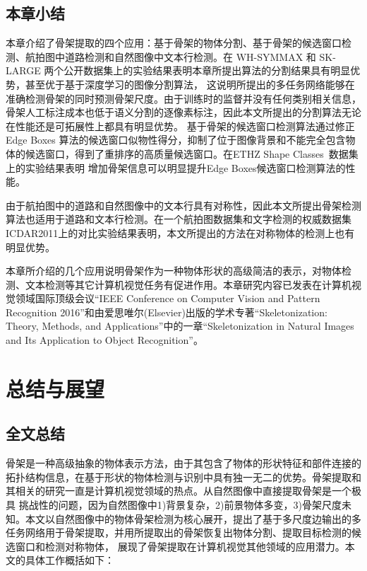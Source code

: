 \documentclass[UTF8]{ctexart}
\numberwithin{equation}{section} %
\numberwithin{table}{section} %
\begin{document}
\subsection{本章小结}
本章介绍了骨架提取的四个应用：基于骨架的物体分割、基于骨架的候选窗口检测、航拍图中道路检测和自然图像中文本行检测。在 WH-SYMMAX 和 SK-LARGE 两个公开数据集上的实验结果表明本章所提出算法的分割结果具有明显优势，甚至优于基于深度学习的图像分割算法，
这说明所提出的多任务网络能够在准确检测骨架的同时预测骨架尺度。由于训练时的监督并没有任何类别相关信息，骨架人工标注成本也低于语义分割的逐像素标注，因此本文所提出的分割算法无论在性能还是可拓展性上都具有明显优势。
基于骨架的候选窗口检测算法通过修正 Edge Boxes 算法的候选窗口似物性得分，抑制了位于图像背景和不能完全包含物体的候选窗口，得到了重排序的高质量候选窗口。在ETHZ Shape Classes~\cite{ferrari2006object}数据集上的实验结果表明
增加骨架信息可以明显提升Edge Boxes候选窗口检测算法的性能。

由于航拍图中的道路和自然图像中的文本行具有对称性，因此本文所提出骨架检测算法也适用于道路和文本行检测。在一个航拍图数据集和文字检测的权威数据集ICDAR2011上的对比实验结果表明，本文所提出的方法在对称物体的检测上也有明显优势。

本章所介绍的几个应用说明骨架作为一种物体形状的高级简洁的表示，对物体检测、文本检测等其它计算机视觉任务有促进作用。本章研究内容已发表在计算机视觉领域国际顶级会议“IEEE Conference on Computer Vision and Pattern Recognition 2016”和由爱思唯尔(Elsevier)出版的学术专著“Skeletonization: Theory, Methods, and Applications”中的一章“Skeletonization in Natural Images and Its Application to Object Recognition”。

\pagebreak
\section{总结与展望}
\subsection{全文总结}
骨架是一种高级抽象的物体表示方法，由于其包含了物体的形状特征和部件连接的拓扑结构信息，在基于形状的物体检测与识别中具有独一无二的优势。骨架提取和其相关的研究一直是计算机视觉领域的热点。从自然图像中直接提取骨架是一个极具
挑战性的问题，因为自然图像中1)背景复杂，2)前景物体多变，3)骨架尺度未知。本文以自然图像中的物体骨架检测为核心展开，提出了基于多尺度边输出的多任务网络用于骨架提取，并用所提取出的骨架恢复出物体分割、提取目标检测的候选窗口和检测对称物体，
展现了骨架提取在计算机视觉其他领域的应用潜力。本文的具体工作概括如下：
\end{document}
